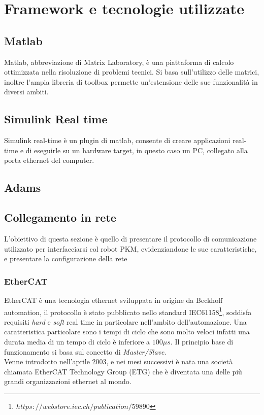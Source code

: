 \section{Framework e tecnologie utilizzate}
\subsection{Matlab}
Matlab, abbreviazione di Matrix Laboratory, è una piattaforma di calcolo ottimizzata nella risoluzione di problemi tecnici. Si basa sull'utilizzo delle matrici, inoltre l'ampia libreria di toolbox permette un'estensione delle sue funzionalità in diversi ambiti. 

\subsection{Simulink Real time}
Simulink real-time è un plugin di matlab, consente di creare applicazioni real-time e di eseguirle su un hardware target, in questo caso un PC, collegato alla porta ethernet del computer.
\subsection{Adams}
\subsection{Collegamento in rete}
L'obiettivo di questa sezione è quello di presentare il protocollo di comunicazione utilizzato per interfacciarsi col robot PKM, evidenziandone le sue caratteristiche, e presentare la configurazione della rete
\subsubsection{EtherCAT}
EtherCAT è una tecnologia ethernet sviluppata in origine da Beckhoff automation, il protocollo è stato pubblicato nello standard IEC61158\footnote{${https://webstore.iec.ch/publication/59890}$}, soddisfa requisiti \textit{hard} e \textit{soft} real time in particolare nell'ambito dell'automazione. Una caratteristica particolare sono i tempi di ciclo che sono molto veloci infatti una durata media di un tempo di ciclo è inferiore a $100 \mu s$. Il principio base di funzionamento si basa sul concetto di \textit{Master/Slave}.
\\Venne introdotto nell'aprile 2003, e nei mesi successivi è nata una società chiamata EtherCAT Technology Group (ETG) che è diventata una delle più grandi organizzazioni ethernet al mondo.

